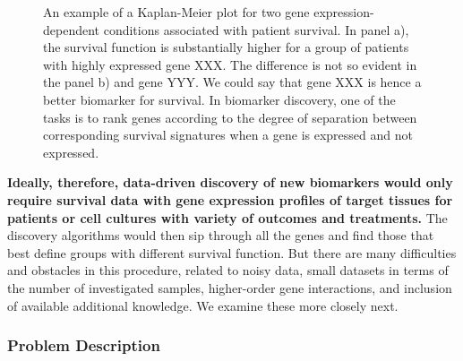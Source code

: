 \documentclass[11pt,a4paper]{article}
\renewcommand{\bold}{\textbf}
\begin{document}
\begin{figure}
\caption{An example of a Kaplan-Meier plot for two gene expression-dependent conditions associated with patient survival. In panel a), the survival function is substantially higher for a group of patients with highly expressed gene XXX. The difference is not so evident in the panel b) and gene YYY. We could say that gene XXX is hence a better biomarker for survival. In biomarker discovery, one of the tasks is to rank genes according to the degree of separation between corresponding survival signatures when a gene is expressed and not expressed.}
\label{fig:km-marker}
\end{figure}

\bold{ Ideally, therefore, data-driven discovery of new biomarkers would only require survival data with gene expression profiles of target tissues for patients or cell cultures with variety of outcomes and treatments.} The discovery algorithms would then sip through all the genes and find those that best define groups with different survival function. But there are many difficulties and obstacles in this procedure, related to noisy data, small datasets in terms of the number of investigated samples, higher-order gene interactions, and inclusion of available additional knowledge. We examine these more closely next.

\subsubsection*{Problem Description}
\end{document}
